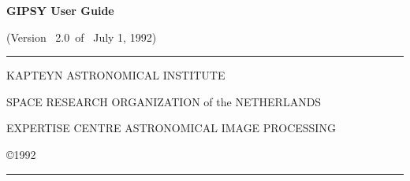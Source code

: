 %
%
%
%
%
%
%
%
%
%
\setlength{\textwidth}{16cm}
\setlength{\oddsidemargin}{0cm}
\setlength{\evensidemargin}{0cm}
\newcommand{\gipchapter}[1]{
   \chapter{#1}
   \markboth{\hfill \kop Chapter \thechapter.}{\kop #1. \hfill}
}
\newcommand{\keyword}[1]{{\tt #1}}
\newcommand{\usercmd}[1]{{\sf #1}}
\newcommand{\descriptor}[1]{{\tt #1}}
\newcommand{\program}[1]{{\sf #1}}
\newcommand{\keystring}[2]{
   \vspace{0.5\baselineskip}
   \keyword{#1}\usercmd{#2}
   \vspace{0.5\baselineskip}
}
\newcommand{\carr}{$<$CR$>$}
\pagestyle{myheadings}
\frenchspacing
\setlength{\unitlength}{1cm}
\setlength{\textheight}{21cm}
\setlength{\parindent}{0cm}
%
%
\newcommand{\version}{2.0}
\newcommand{\update}{July 1, 1992}



\thispagestyle{empty}
\vspace*{3cm}

\begin{center}

{\Huge\bf GIPSY User Guide}

\vspace*{0.5cm}

(Version ~\version ~of ~\update) 

\vfill

\rule{\textwidth}{1mm}

\bigskip

{\sf KAPTEYN ASTRONOMICAL INSTITUTE}

\bigskip

{\sf SPACE RESEARCH ORGANIZATION of the NETHERLANDS}

\bigskip

{\sf EXPERTISE CENTRE ASTRONOMICAL IMAGE PROCESSING}

\bigskip

{\sf \copyright 1992}

\bigskip

\rule{\textwidth}{1mm}

\end{center} 


